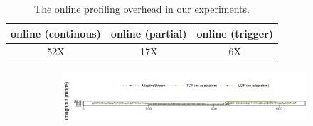 
\begin{table}[t]
  \centering
  \begin{tabular}{c c c}
    \toprule
    online (continous) & online (partial) & online (trigger) \\
    \midrule
    52X   & 17X              & 6X \\
    \bottomrule
  \end{tabular}
  \caption{The online profiling overhead in our experiments.}
  \label{tab:online}
\end{table}

\begin{figure}[!htb]
  \begin{subfigure}[t]{0.7\textwidth}
    \centering
    \includegraphics[width=\textwidth]{figures/runtime-legend.pdf}
  \end{subfigure}
  \\
  \vspace{1em}
  \begin{subfigure}[t]{0.3\textwidth}
    \centering

\end{subfigure}
\end{figure}
